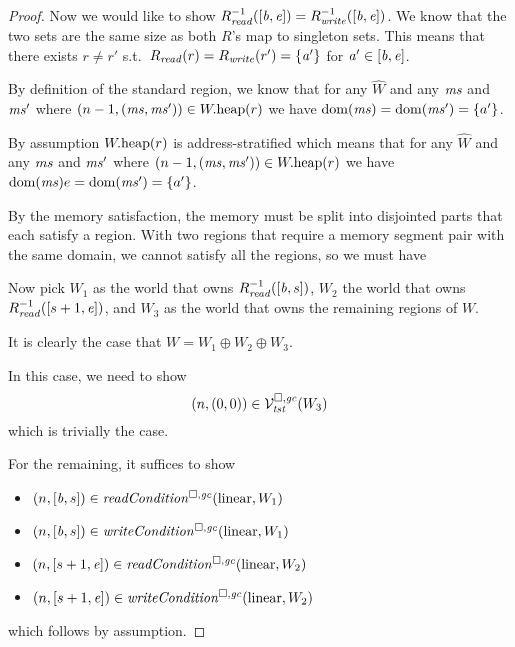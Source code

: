 \begin{proof}
Now we would like to show $R_{\var{read}}^{-1}([\baddr,\eaddr]) = R_{\var{write}}^{-1}([\baddr,\eaddr])$.
We know that the two sets are the same size as both $R$'s map to singleton sets.
This means that there exists $r \neq r'$ s.t.\ $R_{\var{read}}(r) =
R_{\var{write}}(r') = \{\aaddr'\}$ for $\aaddr' \in [\baddr,\eaddr]$.

By definition of the standard region, we know that for any $\hat{W}$ and any $\ms$ and $\ms'$ where $\npair[n-1]{(\ms,\ms')} \in \pwheap(r)$ we have $\dom(\ms)= \dom(\ms') = \{a'\}$.

By assumption $\pwheap(r)$ is address-stratified which means that for any $\hat{W}$ and any $\ms$ and $\ms'$ where $\npair[n-1]{(\ms,\ms')} \in \pwheap(r)$ we have $\dom(\ms)e= \dom(\ms') = \{a'\}$.

By the memory satisfaction, the memory must be split into disjointed parts that
each satisfy a region. With two regions that require a memory segment pair with
the same domain, we cannot satisfy all the regions, so we must have

Now pick $W_1$ as the world that owns $R_{\var{read}}^{-1}([\baddr,s])$, $W_2$
the world that owns $R_{\var{read}}^{-1}([s+1,\eaddr])$, and $W_3$ as the world
that owns the remaining regions of $W$.

It is clearly the case that $W = W_1 \oplus W_2 \oplus W_3$.

In this case, we need to show
\[
  \npair{(0,0)} \in \lrvg{\trust}(W_3)
\]
which is trivially the case.

For the remaining, it suffices to show
\begin{itemize}
\item $\npair{[\baddr,s]} \in \readCond{\linear,W_1}$
\item $\npair{[\baddr,s]} \in \writeCond{\linear,W_1}$
\item $\npair{[s+1,\eaddr]} \in \readCond{\linear,W_2}$
\item $\npair{[s+1,\eaddr]} \in \writeCond{\linear,W_2}$
\end{itemize}
which follows by assumption.
\end{proof}

